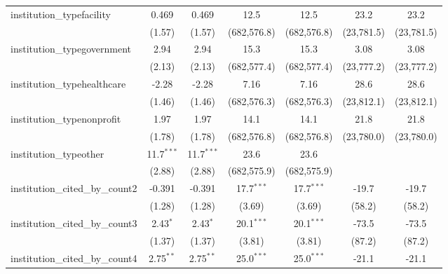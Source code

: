\begin{tabular}{lcccccc}
   institution\_typefacility             & 0.469         & 0.469         & 12.5          & 12.5          & 23.2         & 23.2\\   
                                         & (1.57)        & (1.57)        & (682,576.8)   & (682,576.8)   & (23,781.5)   & (23,781.5)\\   
   institution\_typegovernment           & 2.94          & 2.94          & 15.3          & 15.3          & 3.08         & 3.08\\   
                                         & (2.13)        & (2.13)        & (682,577.4)   & (682,577.4)   & (23,777.2)   & (23,777.2)\\   
   institution\_typehealthcare           & -2.28         & -2.28         & 7.16          & 7.16          & 28.6         & 28.6\\   
                                         & (1.46)        & (1.46)        & (682,576.3)   & (682,576.3)   & (23,812.1)   & (23,812.1)\\   
   institution\_typenonprofit            & 1.97          & 1.97          & 14.1          & 14.1          & 21.8         & 21.8\\   
                                         & (1.78)        & (1.78)        & (682,576.8)   & (682,576.8)   & (23,780.0)   & (23,780.0)\\   
   institution\_typeother                & 11.7$^{***}$  & 11.7$^{***}$  & 23.6          & 23.6          &              &   \\   
                                         & (2.88)        & (2.88)        & (682,575.9)   & (682,575.9)   &              &   \\   
   institution\_cited\_by\_count2        & -0.391        & -0.391        & 17.7$^{***}$  & 17.7$^{***}$  & -19.7        & -19.7\\   
                                         & (1.28)        & (1.28)        & (3.69)        & (3.69)        & (58.2)       & (58.2)\\   
   institution\_cited\_by\_count3        & 2.43$^{*}$    & 2.43$^{*}$    & 20.1$^{***}$  & 20.1$^{***}$  & -73.5        & -73.5\\   
                                         & (1.37)        & (1.37)        & (3.81)        & (3.81)        & (87.2)       & (87.2)\\   
   institution\_cited\_by\_count4        & 2.75$^{**}$   & 2.75$^{**}$   & 25.0$^{***}$  & 25.0$^{***}$  & -21.1        & -21.1\\   

\end{tabular}
